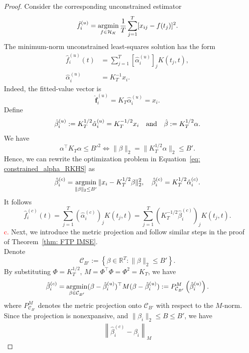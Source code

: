 \begin{proof}
Consider the corresponding unconstrained estimator
\[
\hat f_i^{(u)}
=
\operatorname*{argmin}_{f\in\mathcal H_K}
\frac1T\sum_{j=1}^T
[x_{ij}-f(t_j)]^2.
\]
The minimum-norm unconstrained least-squares solution has the form
\begin{equation}
    \begin{aligned}
        \hat f_i^{(u)}(t)
        &=
        \sum_{j=1}^T [\hat\alpha_i^{(u)}]_jK(t_j,t),\\
        \hat\alpha_i^{(u)}
        &=
        K_T^{-1}x_i.
    \end{aligned}
\end{equation}
Indeed, the fitted-value vector is
\[
\hat{\mathbf{f}}_i^{(u)}
=
K_T\hat\alpha_i^{(u)}
=
x_i.
\]
Define
\[
\hat{\beta}_i^{(u)}
:=
K_T^{1/2}\hat\alpha_i^{(u)}
=
K_T^{-1/2}x_i
\text{\quad and\quad}
\hat{\beta} := K_T^{1/2}\alpha.
\]
We have
\[
\alpha^\top K_T\alpha\le {B'}^2
\Longleftrightarrow
\|\beta\|_2 = \|K_T^{1/2}\alpha\|_2\le B'.
\]
Hence, we can rewrite the optimization problem in Equation~\eqref{eq: constrained_alpha_RKHS} as
\begin{equation}
    \hat\beta_i^{(c)}
    =
    \operatorname*{argmin}_{\|\beta\|_2\le B'}
    \|x_i-K_T^{1/2}\beta\|_2^2,
    \quad \hat\beta_i^{(c)} = K_T^{1/2}\hat\alpha_i^{(c)}.
    \label{eq: constrained_beta_RKHS}
\end{equation}
It follows
\[
\hat f_i^{(c)}(t)
=
\sum_{j=1}^T
(\hat\alpha_i^{(c)})_jK(t_j,t)
=
\sum_{j=1}^T
(K_T^{-1/2}\hat\beta_i^{(c)})_jK(t_j,t).
\]
\textcolor{red}{c.} 
Next, we introduce the metric projection and follow similar steps in the proof of Theorem~\ref{thm: FTP IMSE}.\\
Denote
\[
\mathcal C_{B'}
:=
\left\{
\beta\in\mathbb R^T: \|\beta\|_2\leq B'
\right\}.
\]
By substituting $\Phi = K_T^{1/2}$, $M = \Phi^\top \Phi = \Phi^2 = K_T$, we have
\begin{equation}
\hat{\beta}_i^{(c)}
=
\operatorname*{argmin}_{\beta\in\mathcal C_{B'}}
(\beta-\hat{\beta}_i^{(u)})^\top
M
(\beta-\hat{\beta}_i^{(u)})
:= P_{\mathcal C_{B'}}^{M}
\left(
\hat{\beta}_i^{(u)}
\right).
\label{eq:constrained_projection_RKHS}
\end{equation}
where $P_{\mathcal C_{B'}}^{M}$ denotes the metric projection onto
$\mathcal C_{B'}$ with respect to the $M$-norm.\\
Since the projection is nonexpansive, and $\|\beta_i\|_2\leq B\leq B'$, we have
\begin{equation}
    \begin{aligned}
        \left\|
        \hat{\beta}_i^{(c)}-\beta_i
        \right\|_M

\end{aligned}
\end{equation}
\end{proof}
